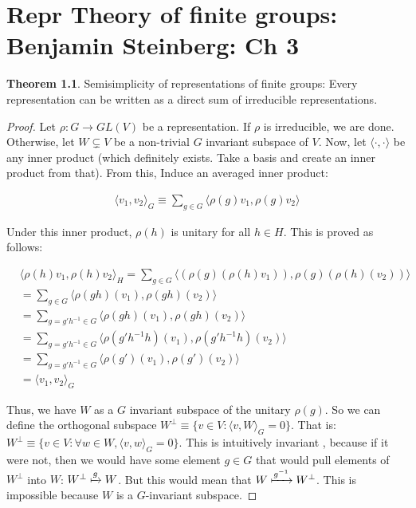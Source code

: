\documentclass{book}
\theoremstyle{definition}
\newtheorem{theorem}{Theorem}
\begin{document}
\tableofcontents



\chapter{Repr Theory of finite groups: Benjamin Steinberg: Ch 3}
\begin{theorem} Semisimplicity of representations of finite groups:
Every representation can be written as a direct sum of irreducible representations.
\end{theorem}
\begin{proof}
Let $\rho : G \rightarrow GL(V)$ be a representation. If $\rho$ is irreducible,
we are done. Otherwise, let $W \subsetneq V$ be a non-trivial $G$ invariant 
subspace of $V$. Now, let $\langle \cdot, \cdot \rangle$ be any
inner product (which definitely exists. Take a basis and create an inner product
from that). From this, Induce an averaged inner product:

\begin{align*}
\langle v_1, v_2 \rangle_G \equiv 
\sum_{g \in G}  \langle \rho(g) v_1, \rho(g) v_2 \rangle
\end{align*}

Under this inner product, $\rho(h)$ is unitary for all $h \in H$. This is
proved as follows:

\begin{align*}
&\langle \rho(h) v_1, \rho(h) v_2 \rangle_H = \sum_{g \in G}  \langle (\rho(g)(\rho(h) v_1)), \rho(g)(\rho(h)(v_2)) \rangle \\
&= \sum_{g \in G}  \langle \rho(gh) (v_1), \rho(gh)(v_2) \rangle \\
&= \sum_{g = g' h^{-1} \in G}  \langle \rho(gh) (v_1), \rho(gh)(v_2) \rangle \\
&= \sum_{g = g' h^{-1} \in G}  \langle \rho(g' h^{-1} h) (v_1), \rho(g' h^{-1} h)(v_2) \rangle \\
&= \sum_{g = g' h^{-1} \in G}  \langle \rho(g') (v_1), \rho(g')(v_2) \rangle \\
&= \langle v_1 , v_2 \rangle_G
\end{align*}

Thus, we have $W$ as a $G$ invariant subspace of the unitary $\rho(g)$. So we
can define the orthogonal subspace $W^\perp \equiv \{ v \in V : \langle v, W \rangle_G = 0 \}$. That is:
$W^\perp \equiv \{ v \in V : \forall w \in W, \langle v, w \rangle_G = 0\}$.
This is intuitively invariant , because if it were not, then we would have some
element $g \in G$ that would pull elements of $W^\perp$ into $W$: $W^\perp \xmapsto{g} W$.
But this would mean that $W \xmapsto{g^{-1}} W^\perp$. This is impossible because $W$
is a $G$-invariant subspace.


\end{proof}
\end{document}
